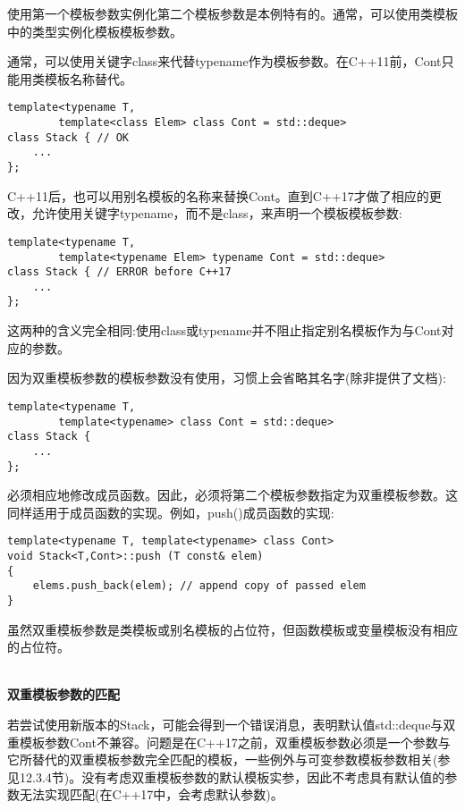 使用第一个模板参数实例化第二个模板参数是本例特有的。通常，可以使用类模板中的类型实例化模板模板参数。

通常，可以使用关键字class来代替typename作为模板参数。在C++11前，Cont只能用类模板名称替代。

\begin{lstlisting}[style=styleCXX]
template<typename T,
		template<class Elem> class Cont = std::deque>
class Stack { // OK
	...
};
\end{lstlisting}

C++11后，也可以用别名模板的名称来替换Cont。直到C++17才做了相应的更改，允许使用关键字typename，而不是class，来声明一个模板模板参数:

\begin{lstlisting}[style=styleCXX]
template<typename T,
		template<typename Elem> typename Cont = std::deque>
class Stack { // ERROR before C++17
	...
};
\end{lstlisting}

这两种的含义完全相同:使用class或typename并不阻止指定别名模板作为与Cont对应的参数。

因为双重模板参数的模板参数没有使用，习惯上会省略其名字(除非提供了文档):

\begin{lstlisting}[style=styleCXX]
template<typename T,
		template<typename> class Cont = std::deque>
class Stack {
	...
};
\end{lstlisting}

必须相应地修改成员函数。因此，必须将第二个模板参数指定为双重模板参数。这同样适用于成员函数的实现。例如，push()成员函数的实现:

\begin{lstlisting}[style=styleCXX]
template<typename T, template<typename> class Cont>
void Stack<T,Cont>::push (T const& elem)
{
	elems.push_back(elem); // append copy of passed elem
}
\end{lstlisting}

虽然双重模板参数是类模板或别名模板的占位符，但函数模板或变量模板没有相应的占位符。

\hspace*{\fill} \\ %
\noindent
\textbf{双重模板参数的匹配}

若尝试使用新版本的Stack，可能会得到一个错误消息，表明默认值std::deque与双重模板参数Cont不兼容。问题是在C++17之前，双重模板参数必须是一个参数与它所替代的双重模板参数完全匹配的模板，一些例外与可变参数模板参数相关(参见12.3.4节)。没有考虑双重模板参数的默认模板实参，因此不考虑具有默认值的参数无法实现匹配(在C++17中，会考虑默认参数)。

